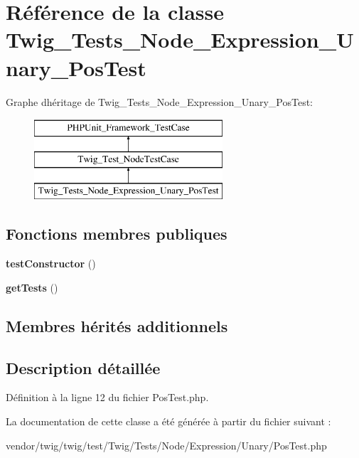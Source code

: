 \hypertarget{class_twig___tests___node___expression___unary___pos_test}{}\section{Référence de la classe Twig\+\_\+\+Tests\+\_\+\+Node\+\_\+\+Expression\+\_\+\+Unary\+\_\+\+Pos\+Test}
\label{class_twig___tests___node___expression___unary___pos_test}
Graphe d\textquotesingle{}héritage de Twig\+\_\+\+Tests\+\_\+\+Node\+\_\+\+Expression\+\_\+\+Unary\+\_\+\+Pos\+Test\+:\begin{figure}[H]
\begin{center}
\leavevmode
\includegraphics[height=3.000000cm]{class_twig___tests___node___expression___unary___pos_test}
\end{center}
\end{figure}
\subsection*{Fonctions membres publiques}
\begin{DoxyCompactItemize}
\item 
{\bfseries test\+Constructor} ()\hypertarget{class_twig___tests___node___expression___unary___pos_test_a47094dc941e72950570900d1418f89c6}{}\label{class_twig___tests___node___expression___unary___pos_test_a47094dc941e72950570900d1418f89c6}

\item 
{\bfseries get\+Tests} ()\hypertarget{class_twig___tests___node___expression___unary___pos_test_a7e247dd31cc8d37a6c97353a062a0080}{}\label{class_twig___tests___node___expression___unary___pos_test_a7e247dd31cc8d37a6c97353a062a0080}

\end{DoxyCompactItemize}
\subsection*{Membres hérités additionnels}


\subsection{Description détaillée}


Définition à la ligne 12 du fichier Pos\+Test.\+php.



La documentation de cette classe a été générée à partir du fichier suivant \+:\begin{DoxyCompactItemize}
\item 
vendor/twig/twig/test/\+Twig/\+Tests/\+Node/\+Expression/\+Unary/Pos\+Test.\+php\end{DoxyCompactItemize}
